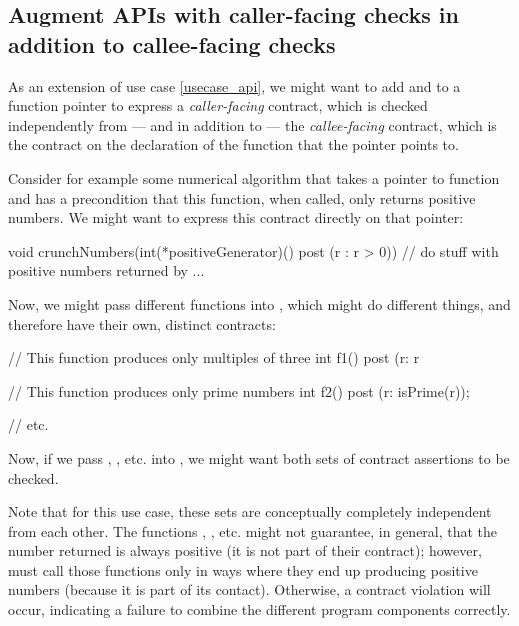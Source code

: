 
\subsection{Augment APIs with caller-facing checks in addition to callee-facing checks}
\label{usecase_callercallee}
As an extension of use case \ref{usecase_api}, we might want to add  and  to a function pointer to express a \emph{caller-facing} contract, which is checked independently from --- and in addition to --- the \emph{callee-facing} contract, which is the contract on the declaration of the function that the pointer points to.

Consider for example some numerical algorithm  that takes a pointer to function and has a precondition that this function, when called, only returns positive numbers. We might want to express this contract directly on that pointer:
\begin{codeblock}
void crunchNumbers(int(*positiveGenerator)() post (r : r > 0)) {
  // do stuff with positive numbers returned by ...
}
\end{codeblock}
Now, we might pass different functions into , which might do different things, and therefore have their own, distinct contracts:
\begin{codeblock}
// This function produces only multiples of three
int f1() post (r: r %

// This function produces only prime numbers
int f2() post (r: isPrime(r));

// etc.
\end{codeblock}
Now, if we pass , , etc. into , we might want both sets of contract assertions to be checked.

Note that for this use case, these sets are conceptually completely independent from each other. The functions , , etc. might not guarantee, in general, that the number returned is always positive (it is not part of their contract); however,  must call those functions only in ways where they end up producing positive numbers (because it is part of its contact). Otherwise, a contract violation will occur, indicating a failure to combine the different program components correctly.


